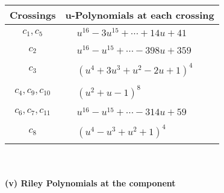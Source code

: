\documentclass[1p]{elsarticle_modified}
\theoremstyle{definition}
\begin{document}
\begin{tabular}{m{50pt}|m{274pt}}
Crossings & \hspace{64pt}u-Polynomials at each crossing \\
\hline $$\begin{aligned}c_{1},c_{5}\end{aligned}$$&$\begin{aligned}
&u^{16}-3 u^{15}+\cdots+14 u+41
\end{aligned}$\\
\hline $$\begin{aligned}c_{2}\end{aligned}$$&$\begin{aligned}
&u^{16}- u^{15}+\cdots-398 u+359
\end{aligned}$\\
\hline $$\begin{aligned}c_{3}\end{aligned}$$&$\begin{aligned}
&(u^4+3 u^3+u^2-2 u+1)^4
\end{aligned}$\\
\hline $$\begin{aligned}c_{4},c_{9},c_{10}\end{aligned}$$&$\begin{aligned}
&(u^2+u-1)^8
\end{aligned}$\\
\hline $$\begin{aligned}c_{6},c_{7},c_{11}\end{aligned}$$&$\begin{aligned}
&u^{16}- u^{15}+\cdots-314 u+59
\end{aligned}$\\
\hline $$\begin{aligned}c_{8}\end{aligned}$$&$\begin{aligned}
&(u^4- u^3+u^2+1)^4
\end{aligned}$\\
\hline
\end{tabular}\\~\\
\newpage\renewcommand{\arraystretch}{1}
\flushleft \textbf{(v) Riley Polynomials at the component}\newline \\
\end{document}
